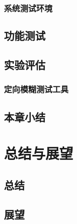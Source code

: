 \documentclass[bachelor]{njupthesis}
\begin{document}
\subsection{系统测试环境}
\section{功能测试}
\section{实验评估}
\subsection{定向模糊测试工具}
\section{本章小结}


\chapter{总结与展望}
\section{总结}
\section{展望}



			
			
\end{document}
